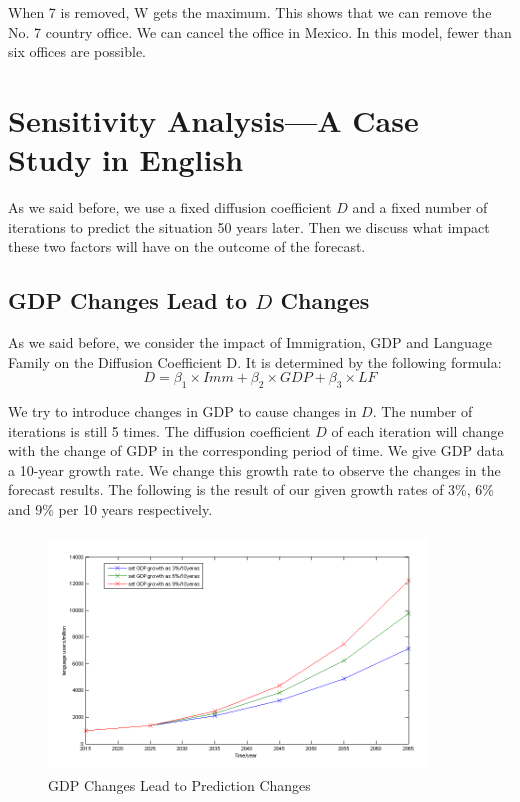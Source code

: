\documentclass{mcmthesis}
\begin{document}
    When 7 is removed, W gets the maximum.
    This shows that we can remove the No. 7 country office. We can cancel the office in Mexico.
    In this model, fewer than six offices are possible.

  \section{Sensitivity Analysis---A Case Study in English}
  As we said before, we use a fixed diffusion coefficient $D$ and a fixed number of iterations to predict the situation 50 years later.
  Then we discuss what impact these two factors will have on the outcome of the forecast.

    \subsection{GDP Changes Lead to $D$ Changes}
    As we said before,
    we consider the impact of Immigration, GDP and Language Family on the Diffusion Coefficient D.
    It is determined by the following formula:
    $$D=\beta_1\times Imm+\beta_2\times GDP+\beta_3\times LF$$

    We try to introduce changes in GDP to cause changes in $D$.
    The number of iterations is still 5 times.
    The diffusion coefficient $D$ of each iteration will change with the change of GDP in the corresponding period of time.
    We give GDP data a 10-year growth rate.
    We change this growth rate to observe the changes in the forecast results.
    The following is the result of our given growth rates of 3\%, 6\% and 9\% per 10 years respectively.

    \begin{figure}[h]
      \centering
      \includegraphics[height=6.3cm,width=10cm]{p6.png}
      \caption{GDP Changes Lead to Prediction Changes}
      \label{p6}
    \end{figure}
\end{document}
